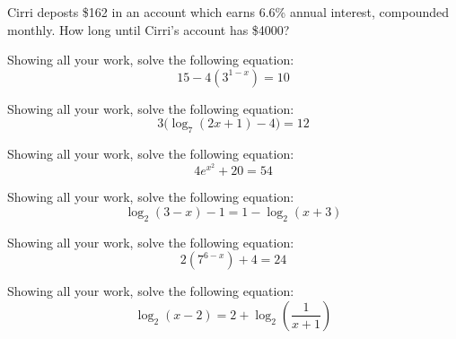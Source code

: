 \documentclass[12pt,letterpaper]{exam}
\begin{document}
\begin{questions}
\newpage
\question[10] Cirri deposts \$162 in an account which earns 6.6\% annual interest, compounded monthly. How long until Cirri's account has \$4000?



\newpage
\question[10] Showing all your work, solve the following equation:
	\[
	15 - 4(3^{1-x})= 10
	\]



\newpage
\question[10] Showing all your work, solve the following equation:
	\[
	3 \big( \log_7(2x + 1) - 4 \big)= 12
	\]



\newpage
\question[10] Showing all your work, solve the following equation:
	\[
	4 e^{x^2} + 20= 54
	\]



\newpage
\question[10] Showing all your work, solve the following equation:
	\[
	\log_2(3 - x) - 1= 1 - \log_2(x + 3)
	\]



\newpage
\question[10] Showing all your work, solve the following equation:
	\[
	2 (7^{6 - x}) + 4= 24
	\]



\newpage
\question[10] Showing all your work, solve the following equation:
	\[
	\log_2(x - 2)= 2 + \log_2 \left( \dfrac{1}{x + 1} \right)
	\]


\end{questions}
\end{document}
